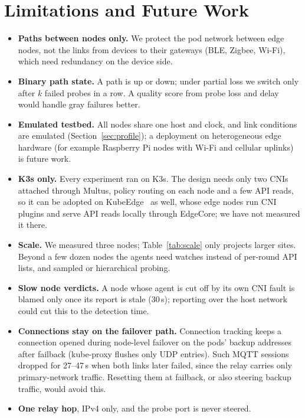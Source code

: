 \documentclass[conference,compsoc]{IEEEtran}
\begin{document}
\section{Limitations and Future Work}
\label{sec:limits}
\begin{itemize}
  \item \textbf{Paths between nodes only.} We protect the pod network between edge
        nodes, not the links from devices to their gateways (BLE, Zigbee, Wi-Fi),
        which need redundancy on the device side.
  \item \textbf{Binary path state.} A path is up or down; under partial loss we switch
        only after $k$ failed probes in a row. A quality score from probe loss and
        delay would handle gray failures better.
  \item \textbf{Emulated testbed.} All nodes share one host and clock, and link
        conditions are emulated (Section~\ref{sec:profile}); a deployment on
        heterogeneous edge hardware (for example Raspberry Pi nodes with Wi-Fi and
        cellular uplinks) is future work.
  \item \textbf{K3s only.} Every experiment ran on K3s. The design needs only two
        CNIs attached through Multus, policy routing on each node and a few API reads,
        so it can be adopted on KubeEdge~\cite{kubeedge} as well, whose edge nodes run
        CNI plugins and serve API reads locally through EdgeCore; we have not
        measured it there.
  \item \textbf{Scale.} We measured three nodes; Table~\ref{tab:scale} only projects
        larger sites. Beyond a few dozen nodes the agents need watches instead of
        per-round API lists, and sampled or hierarchical probing.
  \item \textbf{Slow node verdicts.} A node whose agent is cut off by its own CNI
        fault is blamed only once its report is stale (30\,s); reporting over the host
        network could cut this to the detection time.
  \item \textbf{Connections stay on the failover path.} Connection tracking keeps a
        connection opened during node-level failover on the pods' backup addresses
        after failback (kube-proxy flushes only UDP entries). Such MQTT sessions
        dropped for 27--47\,s when both links later failed, since the relay carries
        only primary-network traffic. Resetting them
        at failback, or also steering backup traffic, would avoid this.
  \item \textbf{One relay hop}, IPv4 only, and the probe port is never steered.
\end{itemize}
\end{document}
